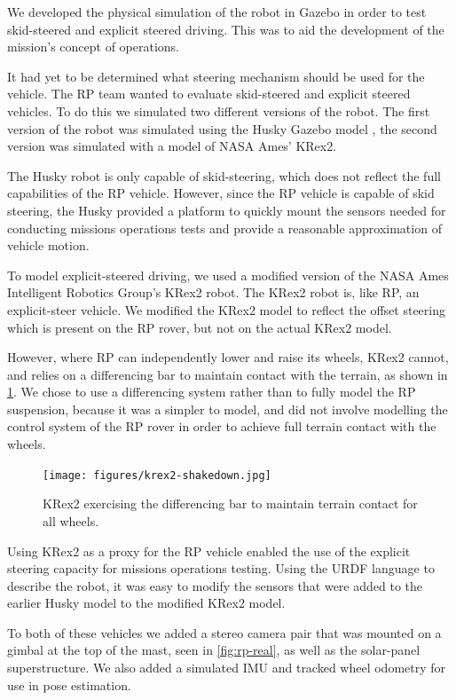 \documentclass[twocolumn,letterpaper]{IEEEAerospaceCLS}  %
\begin{document}
We developed the physical simulation of the robot in Gazebo in order to test skid-steered and explicit steered driving.  This was to aid the development of the mission's concept of operations.  

It had yet to be determined what steering mechanism should be used for the vehicle.  The RP team wanted to evaluate skid-steered and explicit steered vehicles.  To do this we simulated two different versions of the robot.  The first version of the robot was simulated using the Husky Gazebo model \cite{gariepy2015husky}, the second version was simulated with a model of NASA Ames' KRex2.  

The Husky robot is only capable of skid-steering, which does not reflect the full capabilities of the RP vehicle.  However, since the RP vehicle is capable of skid steering, the Husky provided a platform to quickly mount the sensors needed for conducting missions operations tests and provide a reasonable approximation of vehicle motion.  

To model explicit-steered driving, we used a modified version of the NASA Ames Intelligent Robotics Group's KRex2 robot.  The KRex2 robot is, like RP, an explicit-steer vehicle.  We modified the KRex2 model to reflect the offset steering which is present on the RP rover, but not on the actual KRex2 model.  

However, where RP can independently lower and raise its wheels, KRex2 cannot, and relies on a differencing bar to maintain contact with the terrain, as shown in \cref{fig:krex2-differencing}.  We chose to use a differencing system rather than to fully model the RP suspension, because it was a simpler to model, and did not involve modelling the control system of the RP rover in order to achieve full terrain contact with the wheels.

\begin{figure}[htp]
\texttt{[image: figures/krex2-shakedown.jpg]}
\caption{KRex2 exercising the differencing bar to maintain terrain contact for all wheels.  \label{fig:krex2-differencing}}
\end{figure}

Using KRex2 as a proxy for the RP vehicle enabled the use of the explicit steering capacity for missions operations testing.  Using the URDF language to describe the robot, it was easy to modify the sensors that were added to the earlier Husky model to the modified KRex2 model.

To both of these vehicles we added a stereo camera pair that was mounted on a gimbal at the top of the mast, seen in \cref{fig:rp-real}, as well as the solar-panel superstructure.  We also added a simulated IMU and tracked wheel odometry for use in pose estimation.  
\end{document}
